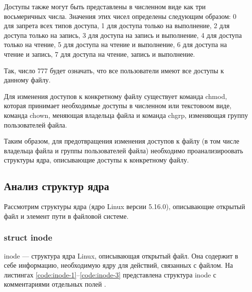 Доступы также могут быть представлены в численном виде как три восьмеричных числа. Значения этих чисел определены следующим образом: 0 для запрета всех типов доступа, 1 для доступа только на выполнение, 2 для доступа только на запись, 3 для доступа на запись и выполнение, 4 для доступа только на чтение, 5 для доступа на чтение и выполнение, 6 для доступа на чтение и запись, 7 для доступа на чтение, запись и выполнение.

Так, число 777 будет означать, что все пользователи имеют все доступы к данному файлу.

Для изменения доступов к конкретному файлу существует команда chmod, которая принимает необходимые доступы в численном или текстовоом виде, команда chown, меняющая владельца файла и команда chgrp, изменяющая группу пользователей файла.

Таким образом, для предотвращения изменения доступов к файлу (в том числе владельца файла и группы пользователей файла) необходимо проанализироовать структуры ядра, описывающие доступы к конкретному файлу.

\subsection{Анализ структур ядра}

Рассмотрим структуры ядра (ядро Linux версии 5.16.0), описывающие открытый файл и элемент пути в файловой системе. 

\subsubsection{struct inode}

inode --- структура ядра Linux, описывающая открытый файл. Она содержит в себе информацию, необходимую ядру для действий, связанных с файлом. На листингах \ref{code:inode-1}--\ref{code:inode-3} представлена структура inode с комментариями отдельных полей \cite{inode-code}.

\clearpage



